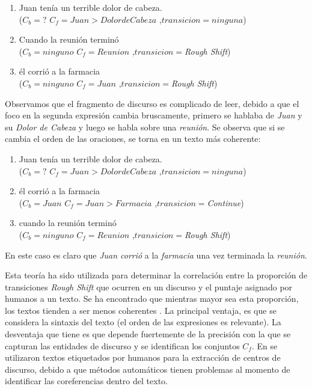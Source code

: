 \documentclass[12pt]{diicc}
\begin{document}
\begin{enumerate}
	\item Juan tenía un terrible dolor de cabeza. \\
	($C_b=?$ $C_f=Juan>Dolor de Cabeza$ ,$transicion=ninguna$)
	\item Cuando la reunión terminó\\
	($C_b=ninguno$ $C_f=Reunion$ ,$transicion=${\em Rough Shift})
	\item él corrió a la farmacia\\
	($C_b=ninguno$ $C_f=Juan$ ,$transicion=${\em Rough Shift})
\end{enumerate}

Observamos que el fragmento de discurso es complicado de leer, debido a que el foco en la segunda expresión cambia bruscamente, primero se hablaba de {\em Juan} y su {\em Dolor de Cabeza} y luego se habla sobre una {\em reunión}. Se observa que si se cambia el orden de las oraciones, se torna en un texto más coherente:

\begin{enumerate}
	\item Juan tenía un terrible dolor de cabeza. \\
	($C_b=?$ $C_f=Juan>Dolor de Cabeza$ ,$transicion=ninguna$)
	\item él corrió a la farmacia\\
	($C_b=Juan$ $C_f=Juan>Farmacia$ ,$transicion=${\em Continue})
	\item cuando la reunión terminó\\
	($C_b=ninguno$ $C_f=Reunion$ ,$transicion=${\em Rough Shift})
\end{enumerate}

En este caso es claro que {\em Juan corrió} a la {\em farmacia} una vez terminada la {\em reunión}.

Esta teoría ha sido utilizada para determinar la correlación entre la proporción de transiciones {\em Rough Shift} que ocurren en un discurso y el puntaje asignado por humanos a un texto. Se ha encontrado que mientras mayor sea esta proporción, los textos tienden a ser menos coherentes \cite{t45}. La principal ventaja, es que se considera la sintaxis del texto (el orden de las expresiones es relevante). La desventaja que tiene es que depende fuertemente de la precisión con la que se capturan las entidades de discurso y se identifican los conjuntos $C_f$. En \cite{t45} se utilizaron textos etiquetados por humanos para la extracción de centros de discurso, debido a que métodos automáticos tienen problemas al momento de identificar las coreferencias dentro del texto.
\end{document}
